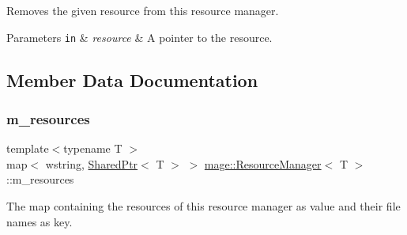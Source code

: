Removes the given resource from this resource manager.


\begin{DoxyParams}[1]{Parameters}
\mbox{\tt in}  & {\em resource} & A pointer to the resource. \\
\hline
\end{DoxyParams}


\subsection{Member Data Documentation}
\hypertarget{classmage_1_1_resource_manager_a7d5f31a34e76f343988b7d6e9a62a617}{}\label{classmage_1_1_resource_manager_a7d5f31a34e76f343988b7d6e9a62a617} 
\subsubsection{\texorpdfstring{m\+\_\+resources}{m\_resources}}
{\footnotesize\ttfamily template$<$typename T $>$ \\
map$<$ wstring, \hyperlink{namespacemage_a1e01ae66713838a7a67d30e44c67703e}{Shared\+Ptr}$<$ T $>$ $>$ \hyperlink{classmage_1_1_resource_manager}{mage\+::\+Resource\+Manager}$<$ T $>$\+::m\+\_\+resources\hspace{0.3cm}{\ttfamily [private]}}

The map containing the resources of this resource manager as value and their file names as key. 